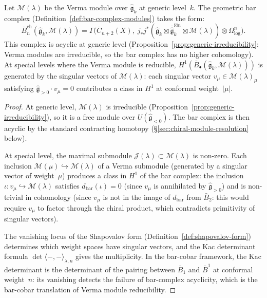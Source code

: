 \begin{proposition}
\label{prop:verma-bar-complex}
Let $\mathcal{M}(\lambda)$ be the Verma module over
$\widehat{\mathfrak{g}}_k$ at generic level~$k$.  The geometric bar
complex \textup{(}Definition~\textup{\ref{def:bar-complex-modules})}
takes the form:
\[
\bar{B}_n^{\mathrm{ch}}(\widehat{\mathfrak{g}}_k, \mathcal{M}(\lambda))
= \Gamma\bigl(\overline{C}_{n+2}(X),\;
j_*j^*(\widehat{\mathfrak{g}}_k \boxtimes
\overline{\widehat{\mathfrak{g}}}_k^{\boxtimes n} \boxtimes
\mathcal{M}(\lambda)) \otimes \Omega^n_{\log}\bigr).
\]
This complex is acyclic at generic level
\textup{(}Proposition~\textup{\ref{prop:generic-irreducibility}}:
Verma modules are irreducible, so the bar complex has no higher
cohomology\textup{)}.  At special levels where the Verma module is
reducible, $H^1(\bar{B}_\bullet(\widehat{\mathfrak{g}}_k,
\mathcal{M}(\lambda)))$ is generated by the singular vectors of
$\mathcal{M}(\lambda)$: each singular vector
$v_\mu \in \mathcal{M}(\lambda)_\mu$ satisfying
$\widehat{\mathfrak{g}}_{>0} \cdot v_\mu = 0$ contributes a class
in $H^1$ at conformal weight~$|\mu|$.
\end{proposition}

\begin{proof}
At generic level, $\mathcal{M}(\lambda)$ is irreducible
(Proposition~\ref{prop:generic-irreducibility}), so it is a free
module over $U(\widehat{\mathfrak{g}}_{<0})$.  The bar complex is
then acyclic by the standard contracting homotopy
(\S\ref{sec:chiral-module-resolution} below).

At special level, the maximal submodule
$\mathcal{J}(\lambda) \subset \mathcal{M}(\lambda)$ is non-zero.
Each inclusion $\mathcal{M}(\mu) \hookrightarrow \mathcal{M}(\lambda)$
of a Verma submodule (generated by a singular vector of weight~$\mu$)
produces a class in $H^1$ of the bar complex: the inclusion
$\iota: v_\mu \hookrightarrow \mathcal{M}(\lambda)$ satisfies
$d_{\mathrm{bar}}(\iota) = 0$ (since $v_\mu$ is annihilated by
$\widehat{\mathfrak{g}}_{>0}$) and is non-trivial in cohomology
(since $v_\mu$ is not in the image of $d_{\mathrm{bar}}$ from
$\bar{B}_2$: this would require $v_\mu$ to factor through the
chiral product, which contradicts primitivity of singular vectors).

The vanishing locus of the Shapovalov form
(Definition~\ref{def:shapovalov-form}) determines which weight
spaces have singular vectors, and the Kac determinant formula
$\det \langle -, - \rangle_{\lambda, n}$ gives the multiplicity.
In the bar-cobar framework, the Kac determinant is the determinant
of the pairing between $\bar{B}_1$ and $\bar{B}^1$ at conformal
weight~$n$: its vanishing detects the failure of bar-complex
acyclicity, which is the bar-cobar translation of Verma module
reducibility.
\end{proof}

